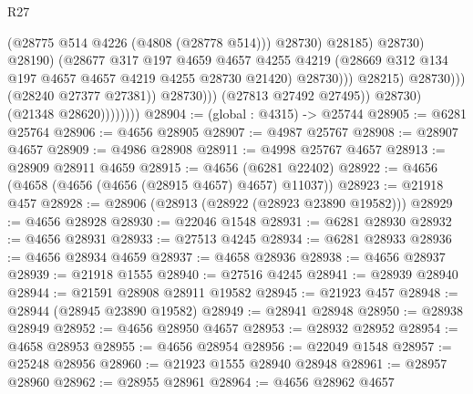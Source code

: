 \begin{lexlean}{R27}
\begin{coremodule}
                                                  (@28775 @514 @4226 (@4808 (@28778 @514)))
                                                  @28730)
                                                @28185)
                                              @28730)
                                            @28190)
                                          (@28677
                                            @317
                                            @197
                                            @4659
                                            @4657
                                            @4255
                                            @4219
                                            (@28669
                                              @312
                                              @134
                                              @197
                                              @4657
                                              @4657
                                              @4219
                                              @4255
                                              @28730
                                              @21420)
                                            @28730)))
                                      @28215)
                                    @28730)))
                              (@28240 @27377 @27381))
                            @28730)))
                      (@27813 @27492 @27495))
                    @28730)
                  (@21348 @28620))))))))
@28904 := (global : @4315) -> @25744
@28905 := @6281 @25764
@28906 := @4656 @28905
@28907 := @4987 @25767
@28908 := @28907 @4657
@28909 := @4986 @28908
@28911 := @4998 @25767 @4657
@28913 := @28909 @28911 @4659
@28915 := @4656 (@6281 @22402)
@28922 := @4656 (@4658 (@4656 (@4656 (@28915 @4657) @4657) @11037))
@28923 := @21918 @457
@28928 := @28906 (@28913 (@28922 (@28923 @23890 @19582)))
@28929 := @4656 @28928
@28930 := @22046 @1548
@28931 := @6281 @28930
@28932 := @4656 @28931
@28933 := @27513 @4245
@28934 := @6281 @28933
@28936 := @4656 @28934 @4659
@28937 := @4658 @28936
@28938 := @4656 @28937
@28939 := @21918 @1555
@28940 := @27516 @4245
@28941 := @28939 @28940
@28944 := @21591 @28908 @28911 @19582
@28945 := @21923 @457
@28948 := @28944 (@28945 @23890 @19582)
@28949 := @28941 @28948
@28950 := @28938 @28949
@28952 := @4656 @28950 @4657
@28953 := @28932 @28952
@28954 := @4658 @28953
@28955 := @4656 @28954
@28956 := @22049 @1548
@28957 := @25248 @28956
@28960 := @21923 @1555 @28940 @28948
@28961 := @28957 @28960
@28962 := @28955 @28961
@28964 := @4656 @28962 @4657

\end{coremodule}
\end{lexlean}
